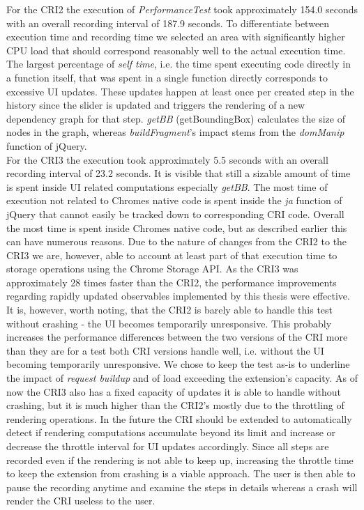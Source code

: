 	For the CRI2 the execution of \emph{PerformanceTest} took approximately 154.0 seconds with an overall recording interval of 187.9 seconds. To differentiate between execution time and recording time we selected an area with significantly higher CPU load that should correspond reasonably well to the actual execution time. The largest percentage of \emph{self time}, i.e. the time spent executing code directly in a function itself, that was spent in a single function directly corresponds to excessive UI updates. These updates happen at least once per created step in the history since the slider is updated and triggers the rendering of a new dependency graph for that step. \emph{getBB} (getBoundingBox) calculates the size of nodes in the graph, whereas  \emph{buildFragment}'s impact stems from the \emph{domManip} function of jQuery.\\
	For the CRI3 the execution took approximately 5.5 seconds with an overall recording interval of 23.2 seconds. It is visible that still a sizable amount of time is spent inside UI related computations especially \emph{getBB}. The most time of execution not related to Chromes native code is spent inside the \emph{ja} function of jQuery that cannot easily be tracked down to corresponding CRI code. Overall the most time is spent inside Chromes native code, but as described earlier this can have numerous reasons. Due to the nature of changes from the CRI2 to the CRI3 we are, however, able to account at least part of that execution time to storage operations using the Chrome Storage API. 
	As the CRI3 was approximately 28 times faster than the CRI2, the performance improvements regarding rapidly updated observables implemented by this thesis were effective. It is, however, worth noting, that the CRI2 is barely able to handle this test without crashing - the UI becomes temporarily unresponsive. This probably increases the performance differences between the two versions of the CRI more than they are for a test both CRI versions handle well, i.e. without the UI becoming temporarily unresponsive. We chose to keep the test as-is to underline the impact of \emph{request buildup} and of load exceeding the extension's capacity.
	As of now the CRI3 also has a fixed capacity of updates it is able to handle without crashing, but it is much higher than the CRI2's mostly due to the throttling of rendering operations. In the future the CRI should be extended to automatically detect if rendering computations accumulate beyond its limit and increase or decrease the throttle interval for UI updates accordingly. Since all steps are recorded even if the rendering is not able to keep up, increasing the throttle time to keep the extension from crashing is a viable approach. The user is then able to pause the recording anytime and examine the steps in details whereas a crash will render the CRI useless to the user.
	
